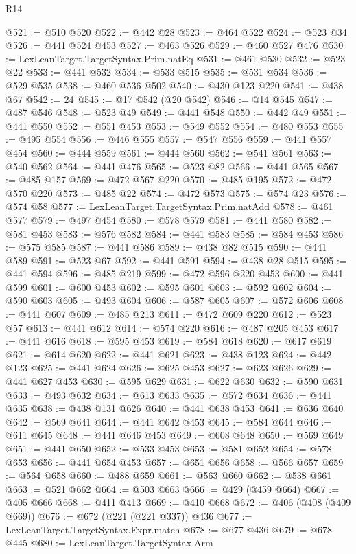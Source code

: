 \begin{lexlean}{R14}
\begin{coremodule}
@521 := @510 @520
@522 := @442 @28
@523 := @464 @522
@524 := @523 @34
@526 := @441 @524 @453
@527 := @463 @526
@529 := @460 @527 @476
@530 := LexLeanTarget.TargetSyntax.Prim.natEq
@531 := @461 @530
@532 := @523 @22
@533 := @441 @532
@534 := @533 @515
@535 := @531 @534
@536 := @529 @535
@538 := @460 @536 @502
@540 := @430 @123 @220
@541 := @438 @67
@542 := 24
@545 := @17 @542 (@20 @542)
@546 := @14 @545
@547 := @487 @546
@548 := @523 @49
@549 := @441 @548
@550 := @442 @49
@551 := @441 @550
@552 := @551 @453
@553 := @549 @552
@554 := @480 @553
@555 := @495 @554
@556 := @446 @555
@557 := @547 @556
@559 := @441 @557 @454
@560 := @444 @559
@561 := @444 @560
@562 := @541 @561
@563 := @540 @562
@564 := @441 @476
@565 := @523 @82
@566 := @441 @565
@567 := @485 @157
@569 := @472 @567 @220
@570 := @485 @195
@572 := @472 @570 @220
@573 := @485 @22
@574 := @472 @573
@575 := @574 @23
@576 := @574 @58
@577 := LexLeanTarget.TargetSyntax.Prim.natAdd
@578 := @461 @577
@579 := @497 @454
@580 := @578 @579
@581 := @441 @580
@582 := @581 @453
@583 := @576 @582
@584 := @441 @583
@585 := @584 @453
@586 := @575 @585
@587 := @441 @586
@589 := @438 @82 @515
@590 := @441 @589
@591 := @523 @67
@592 := @441 @591
@594 := @438 @28 @515
@595 := @441 @594
@596 := @485 @219
@599 := @472 @596 @220 @453
@600 := @441 @599
@601 := @600 @453
@602 := @595 @601
@603 := @592 @602
@604 := @590 @603
@605 := @493 @604
@606 := @587 @605
@607 := @572 @606
@608 := @441 @607
@609 := @485 @213
@611 := @472 @609 @220
@612 := @523 @57
@613 := @441 @612
@614 := @574 @220
@616 := @487 @205 @453
@617 := @441 @616
@618 := @595 @453
@619 := @584 @618
@620 := @617 @619
@621 := @614 @620
@622 := @441 @621
@623 := @438 @123
@624 := @442 @123
@625 := @441 @624
@626 := @625 @453
@627 := @623 @626
@629 := @441 @627 @453
@630 := @595 @629
@631 := @622 @630
@632 := @590 @631
@633 := @493 @632
@634 := @613 @633
@635 := @572 @634
@636 := @441 @635
@638 := @438 @131 @626
@640 := @441 @638 @453
@641 := @636 @640
@642 := @569 @641
@644 := @441 @642 @453
@645 := @584 @644
@646 := @611 @645
@648 := @441 @646 @453
@649 := @608 @648
@650 := @569 @649
@651 := @441 @650
@652 := @533 @453
@653 := @581 @652
@654 := @578 @653
@656 := @441 @654 @453
@657 := @651 @656
@658 := @566 @657
@659 := @564 @658
@660 := @488 @659
@661 := @563 @660
@662 := @538 @661
@663 := @521 @662
@664 := @503 @663
@666 := @429 (@459 @664)
@667 := @405 @666
@668 := @411 @413
@669 := @410 @668
@672 := @406 (@408 (@409 @669))
@676 := @672 (@221 (@221 @337)) @436
@677 := LexLeanTarget.TargetSyntax.Expr.match
@678 := @677 @436
@679 := @678 @445
@680 := LexLeanTarget.TargetSyntax.Arm

\end{coremodule}
\end{lexlean}
